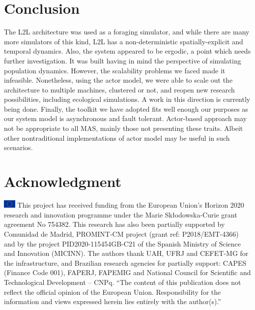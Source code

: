 \documentclass[runningheads]{llncs}
\begin{document}
\section{Conclusion}
\label{sec:conclusion}
The L2L architecture was used as a foraging simulator, and while there are many more simulators of this kind, L2L has a non-deterministic spatially-explicit and temporal dynamics. Also, the system appeared to be ergodic, a point which needs further investigation. It was built having in mind the perspective of simulating population dynamics. However, the scalability problems we faced  made it infeasible. Nonetheless, using the actor model, we were able to scale out the architecture to multiple machines, clustered or not, and reopen new research possibilities, including ecological simulations. A work in this direction is currently being done. Finally, the toolkit we have adopted fits well enough our purposes as our system model is asynchronous and fault tolerant. Actor-based approach may not be appropriate to all MAS, mainly those not presenting these traits. Albeit other nontraditional implementations of actor model may be useful in such scenarios.


\section*{Acknowledgment}

\noindent \includegraphics[width=0.6cm]{bandeira.png} This project has received funding from the European Union’s Horizon 2020 research and innovation programme under the Marie Skłodowska-Curie grant agreement No 754382. This research has also been partially supported by Comunidad de Madrid, PROMINT-CM project (grant ref: P2018/EMT-4366) and by the project PID2020-115454GB-C21 of the Spanish Ministry of Science and Innovation (MICINN). The authors thank UAH, UFRJ and CEFET-MG for the infrastructure, and Brazilian research agencies for partially support: CAPES (Finance Code 001), FAPERJ, FAPEMIG and National Council for Scientific and Technological Development – CNPq. ``The content of this publication does not reflect the official opinion of the European Union. Responsibility for the information and views expressed herein lies entirely with the author(s).''


\FloatBarrier


%

%
%
%


%
\end{document}

